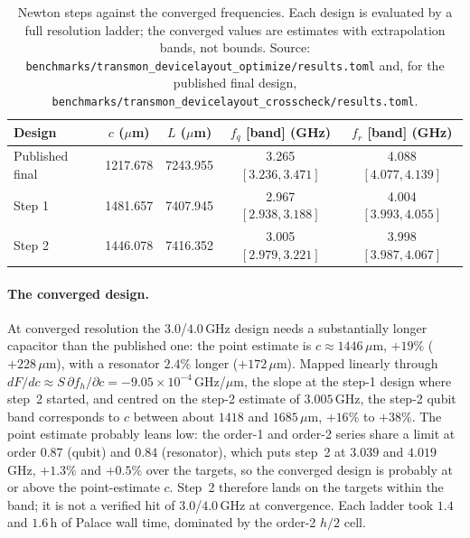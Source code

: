 \documentclass{anvil-paper}
\begin{document}
\begin{table}[tbp]
  \centering
  \caption{Newton steps against the converged frequencies. Each design is
  evaluated by a full resolution ladder; the converged values are
  estimates with extrapolation bands, not bounds. Source:
  \texttt{benchmarks/transmon\_devicelayout\_optimize/results.toml}
  and, for the published final design,
  \texttt{benchmarks/transmon\_devicelayout\_crosscheck/results.toml}.}
  \label{tab:newton-conv}
  \small
  \begin{tabular}{@{}lcccc@{}}
    \toprule
    Design & $c$ ($\mu$m) & $L$ ($\mu$m) & $f_q$ [band] (GHz) & $f_r$ [band] (GHz) \\
    \midrule
    Published final & 1217.678 & 7243.955 & 3.265 $[3.236, 3.471]$ & 4.088 $[4.077, 4.139]$ \\
    Step 1 & 1481.657 & 7407.945 & 2.967 $[2.938, 3.188]$ & 4.004 $[3.993, 4.055]$ \\
    Step 2 & 1446.078 & 7416.352 & 3.005 $[2.979, 3.221]$ & 3.998 $[3.987, 4.067]$ \\
    \bottomrule
  \end{tabular}
\end{table}

\paragraph{The converged design.}
At converged resolution the $3.0$/$4.0$\,GHz design needs a substantially
longer capacitor than the published one: the point estimate is
$c \approx 1446\,\mu$m, $+19\%$ ($+228\,\mu$m), with a resonator $2.4\%$
longer ($+172\,\mu$m). Mapped linearly through $dF/dc \approx
S\,\partial f_h/\partial c = -9.05\times10^{-4}$\,GHz/$\mu$m, the
slope at the step-1 design where step~2 started, and centred on the
step-2 estimate of $3.005$\,GHz, the step-2 qubit band corresponds to
$c$ between about $1418$ and $1685\,\mu$m, $+16\%$ to $+38\%$. The point estimate probably leans low:
the order-1 and order-2 series share a limit at order $0.87$ (qubit) and
$0.84$ (resonator), which puts step~2 at $3.039$ and $4.019$\,GHz,
$+1.3\%$ and $+0.5\%$ over the targets, so the converged design is
probably at or above the point-estimate $c$. Step~2 therefore lands on
the targets within the band; it is not a verified hit of $3.0$/$4.0$\,GHz
at convergence. Each ladder took $1.4$ and $1.6$\,h of Palace wall time,
dominated by the order-2 $h/2$ cell.
\end{document}
